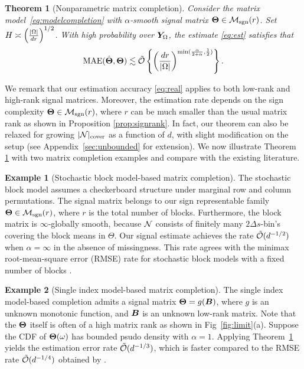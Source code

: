\documentclass[aos]{imsart}
\newtheorem{theorem}{Theorem}%
\theoremstyle{definition}
\newtheorem{example}{Example}
\def\caliM{\tM_{\textup{sgn}}}
\begin{document}
\begin{theorem}[Nonparametric matrix completion]\label{thm:estimation} 
Consider the matrix model~\eqref{eq:modelcompletion} with $\alpha$-smooth signal matrix $\mTheta\in\caliM(r)$. Set $H \asymp \left( |\Omega|\over dr\right)^{1/2}$. With high probability over $\bm Y_\Omega$, the estimate \eqref{eq:est} satisfies that
\begin{equation}\label{eq:real}
\textup{MAE}(\hat \mTheta, \mTheta)\lesssim \tilde \tO\left\{\left(dr \over |\Omega|\right)^{\min({\alpha \over 2+\alpha}, {1\over 2})}\right\}.
\end{equation}
\end{theorem}

\noindent
We remark that our estimation accuracy \eqref{eq:real} applies to both low-rank and high-rank signal matrices. Moreover, the estimation rate depends on the sign complexity $\mTheta\in\caliM(r)$, where $r$ can be much smaller than the usual matrix rank as shown in Proposition \ref{prop:signrank}. In fact, our theorem can also be relaxed for growing $|\mathcal{N}|_{\text{cover}}$ as a function of $d$, with slight modification on the setup (see Appendix~\ref{sec:unbounded} for extension). We now illustrate Theorem \ref{thm:estimation} with two matrix completion examples and compare with the existing literature.  

\begin{example}[Stochastic block model-based matrix completion]
The stochastic block model \cite{chi2020provable} assumes a checkerboard structure under marginal row and column permutations. The signal matrix belongs to our sign representable family $\mTheta \in \caliM(r)$, where $r$ is the total number of blocks. Furthermore, the block matrix is $\infty$-globally smooth, because $\mathcal{N}$ consists of finitely many $2\Delta s$-bin's covering the block means in $\Theta$. Our signal estimate achieves the rate $\tilde{\mathcal{O}}(d^{-1/2})$ when $\alpha=\infty$ in the absence of missingness. This rate agrees with the minimax root-mean-square error (RMSE) rate for stochastic block models with a fixed number of blocks \cite{gao2016optimal}. 
\end{example}

\begin{example}[Single index model-based matrix completion]
The single index model-based completion \cite{ganti2015matrix} admits a signal matrix $\bm{\Theta}=g(\bm B)$, where $g$ is an unknown monotonic function, and $\bm B$ is an unknown low-rank matrix. Note that the $\bm{\Theta}$ itself is often of a high matrix rank as shown in Fig~\ref{fig:limit}(a). Suppose the CDF of $\bm{\Theta}(\omega)$ has bounded psudo density with $\alpha=1$. Applying Theorem~\ref{thm:estimation} yields the estimation error rate $\tilde {\mathcal{O}}(d^{-1/3})$, which is faster compared to the RMSE rate $\tilde {\mathcal{O}}(d^{-1/4})$ obtained by \cite{ganti2015matrix}. 
\end{example}
\end{document}
